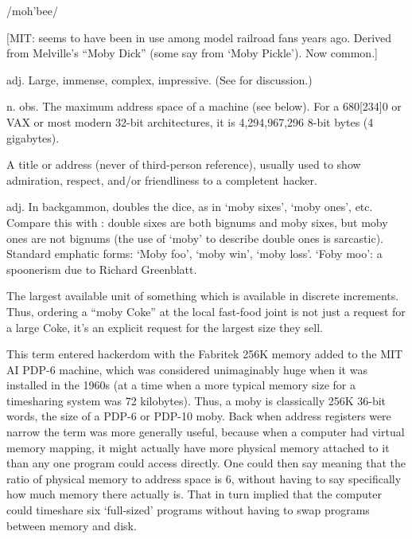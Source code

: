  /moh'bee/

[MIT: seems to have been in use among model railroad fans years ago. Derived from Melville's ``Moby Dick'' (some say from `Moby Pickle').
Now common.]
\begin{inparaenum}
	\item adj. Large, immense, complex, impressive.
		(See  for discussion.)
	\item n. obs. The maximum address space of a machine (see below). For a 680[234]0 or VAX or most modern 32-bit architectures, it is
		4,294,967,296 8-bit bytes (4 gigabytes).
	\item A title or address (never of third-person reference), usually used to show admiration, respect, and/or friendliness to a
		completent hacker.
	\item adj. In backgammon, doubles the dice, as in `moby sixes', `moby ones', etc. Compare this with : double sixes
		are both bignums and moby sixes, but moby ones are not bignums (the use of `moby' to describe double ones is sarcastic). Standard
		emphatic forms: `Moby foo', `moby win', `moby loss'. `Foby moo': a spoonerism due to Richard Greenblatt.
	\item The largest available unit of something which is available in discrete increments. Thus, ordering a ``moby Coke'' at the local
		fast-food joint is not just a request for a large Coke, it's an explicit request for the largest size they sell.
\end{inparaenum}

This term entered hackerdom with the Fabritek 256K memory added to the MIT AI PDP-6 machine, which was considered unimaginably huge when
it was installed in the 1960s (at a time when a more typical memory size for a timesharing system was 72 kilobytes). Thus, a moby is
classically 256K 36-bit words, the size of a PDP-6 or PDP-10 moby. Back when address registers were narrow the term was more generally
useful, because when a computer had virtual memory mapping, it might actually have more physical memory attached to it than any one
program could access directly. One could then say  meaning that the ratio of physical memory to
address space is 6, without having to say specifically how much memory there actually is. That in turn implied that the computer could
timeshare six `full-sized' programs without having to swap programs between memory and disk.

